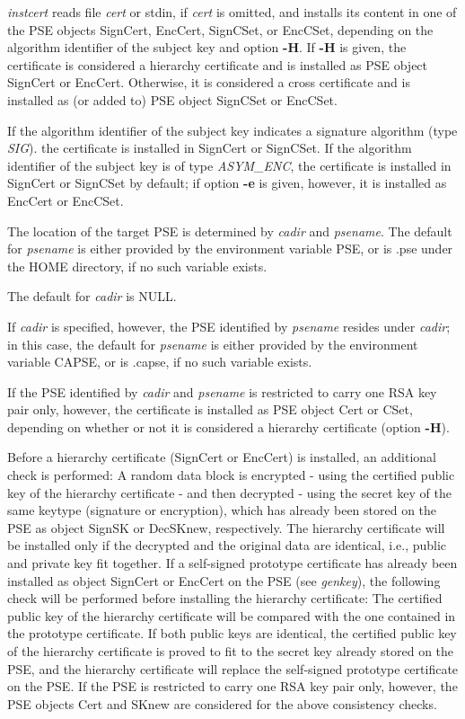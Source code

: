 {\em instcert} reads file {\em cert} or stdin, if {\em cert} is omitted, 
and installs its content in one of the PSE objects SignCert, EncCert, SignCSet, or EncCSet, depending on
the algorithm identifier of the subject key and option {\bf -H}. If {\bf -H} is given, the
certificate is considered a hierarchy certificate and is installed as PSE object SignCert or
EncCert. Otherwise, it is considered a cross certificate and is installed as (or added to) PSE object SignCSet or EncCSet.

If the algorithm identifier of the subject key indicates a signature algorithm (type {\em SIG}).
the certificate is installed in SignCert or SignCSet.
If the algorithm identifier of the subject key is of type {\em ASYM\_ENC}, the certificate
is installed in SignCert or SignCSet by default; if option {\bf -e} is given, however, it is
installed as EncCert or EncCSet.

The location of the target PSE is determined by {\em cadir} and {\em psename}. The default for {\em 
psename} is either provided by the environment variable PSE, or is .pse under the HOME directory, if no such
variable exists.
 
The default for {\em cadir} is NULL. 

If {\em cadir} is specified,
however, the PSE identified by {\em psename} resides under {\em cadir}; in this case, the default
for {\em psename} is either provided by the environment variable CAPSE, or is .capse, if no such variable
exists.

If the PSE identified by {\em cadir} and {\em psename} is restricted to carry one RSA key pair only, 
however, the certificate is installed as PSE object Cert or CSet, depending on whether or not it is considered a hierarchy certificate (option {\bf -H}).

Before a hierarchy certificate (SignCert or EncCert) is installed, an additional check is 
performed:
A random data block is encrypted - using the certified public key of the hierarchy certificate - and then 
decrypted
- using the secret key of the same keytype (signature or encryption), which has already been stored on the 
PSE 
as object SignSK or DecSKnew, respectively. The hierarchy certificate will
be installed only if the decrypted and the original data are identical, i.e., public and private key fit
together.
If a self-signed prototype certificate has already been installed as object SignCert or EncCert
on the PSE (see {\em genkey}), the following check will be performed before installing the hierarchy 
certificate: 
The certified public key of the hierarchy certificate will be compared with the one contained in the prototype 
certificate. If both public keys are identical, the certified public key of the hierarchy certificate is proved to
fit to the secret key already stored on the PSE, and the hierarchy certificate will replace the self-signed
prototype certificate on the PSE.
If the PSE is restricted to carry one RSA key pair only, however, the PSE objects Cert and SKnew are 
considered for the above consistency checks.
 
